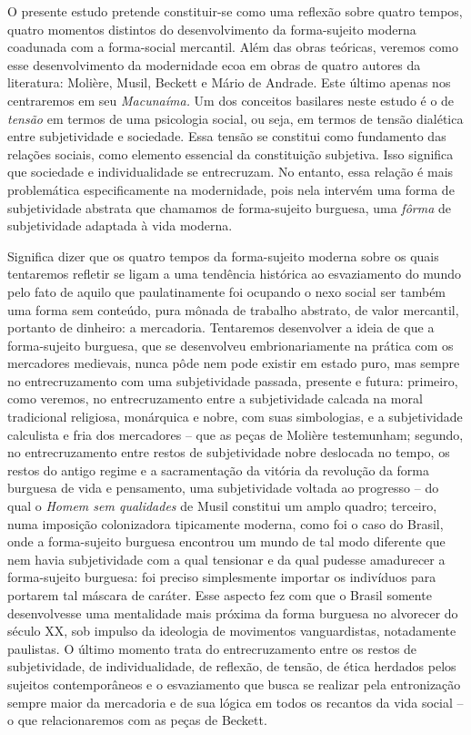 O presente estudo pretende constituir-se como uma reflexão sobre quatro
tempos, quatro momentos distintos do desenvolvimento da forma-sujeito
moderna coadunada com a forma-social mercantil. Além das obras teóricas,
veremos como esse desenvolvimento da modernidade ecoa em obras de quatro
autores da literatura: Molière, Musil, Beckett e Mário de Andrade. Este
último apenas nos centraremos em seu \emph{Macunaíma.} Um dos conceitos
basilares neste estudo é o de \emph{tensão} em termos de uma psicologia
social, ou seja, em termos de tensão dialética entre subjetividade e
sociedade. Essa tensão se constitui como fundamento das relações
sociais, como elemento essencial da constituição subjetiva. Isso
significa que sociedade e individualidade se entrecruzam. No entanto,
essa relação é mais problemática especificamente na modernidade, pois
nela intervém uma forma de subjetividade abstrata que chamamos de
forma-sujeito burguesa, uma \emph{fôrma} de subjetividade adaptada à
vida moderna.

Significa dizer que os quatro tempos da forma-sujeito moderna sobre os
quais tentaremos refletir se ligam a uma tendência histórica ao
esvaziamento do mundo pelo fato de aquilo que paulatinamente foi
ocupando o nexo social ser também uma forma sem conteúdo, pura mônada de
trabalho abstrato, de valor mercantil, portanto de dinheiro: a
mercadoria. Tentaremos desenvolver a ideia de que a forma-sujeito
burguesa, que se desenvolveu embrionariamente na prática com os
mercadores medievais, nunca pôde nem pode existir em estado puro, mas
sempre no entrecruzamento com uma subjetividade passada, presente e
futura: primeiro, como veremos, no entrecruzamento entre a subjetividade
calcada na moral tradicional religiosa, monárquica e nobre, com suas
simbologias, e a subjetividade calculista e fria dos mercadores -- que
as peças de Molière testemunham; segundo, no entrecruzamento entre
restos de subjetividade nobre deslocada no tempo, os restos do antigo
regime e a sacramentação da vitória da revolução da forma burguesa de
vida e pensamento, uma subjetividade voltada ao progresso -- do qual o
\emph{Homem sem qualidades} de Musil constitui um amplo quadro;
terceiro, numa imposição colonizadora tipicamente moderna, como foi o
caso do Brasil, onde a forma-sujeito burguesa encontrou um mundo de tal
modo diferente que nem havia subjetividade com a qual tensionar e da
qual pudesse amadurecer a forma-sujeito burguesa: foi preciso
simplesmente importar os indivíduos para portarem tal máscara de
caráter. Esse aspecto fez com que o Brasil somente desenvolvesse uma
mentalidade mais próxima da forma burguesa no alvorecer do século XX,
sob impulso da ideologia de movimentos vanguardistas, notadamente
paulistas. O último momento trata do entrecruzamento entre os restos de
subjetividade, de individualidade, de reflexão, de tensão, de ética
herdados pelos sujeitos contemporâneos e o esvaziamento que busca se
realizar pela entronização sempre maior da mercadoria e de sua lógica em
todos os recantos da vida social -- o que relacionaremos com as peças de
Beckett.

